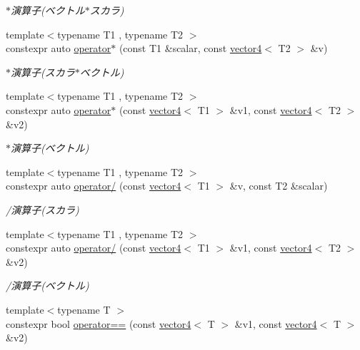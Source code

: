 \begin{DoxyCompactItemize}
\begin{DoxyCompactList}\small\item\em $\ast$演算子(ベクトル$\ast$スカラ) \end{DoxyCompactList}\item 
{\footnotesize template$<$typename T1 , typename T2 $>$ }\\constexpr auto \mbox{\hyperlink{namespacesaki_ad1caaaf5b1af879f2d546a4b2e10974e}{operator$\ast$}} (const T1 \&scalar, const \mbox{\hyperlink{classsaki_1_1vector4}{vector4}}$<$ T2 $>$ \&v)
\begin{DoxyCompactList}\small\item\em $\ast$演算子(スカラ$\ast$ベクトル) \end{DoxyCompactList}\item 
{\footnotesize template$<$typename T1 , typename T2 $>$ }\\constexpr auto \mbox{\hyperlink{namespacesaki_a19656e376d8720e2a67f3d08082770b0}{operator$\ast$}} (const \mbox{\hyperlink{classsaki_1_1vector4}{vector4}}$<$ T1 $>$ \&v1, const \mbox{\hyperlink{classsaki_1_1vector4}{vector4}}$<$ T2 $>$ \&v2)
\begin{DoxyCompactList}\small\item\em $\ast$演算子(ベクトル) \end{DoxyCompactList}\item 
{\footnotesize template$<$typename T1 , typename T2 $>$ }\\constexpr auto \mbox{\hyperlink{namespacesaki_a5525c6da34ded0620ee6d965e687bedc}{operator/}} (const \mbox{\hyperlink{classsaki_1_1vector4}{vector4}}$<$ T1 $>$ \&v, const T2 \&scalar)
\begin{DoxyCompactList}\small\item\em /演算子(スカラ) \end{DoxyCompactList}\item 
{\footnotesize template$<$typename T1 , typename T2 $>$ }\\constexpr auto \mbox{\hyperlink{namespacesaki_ac72c945dc5e1e8fe6065beac4a310a54}{operator/}} (const \mbox{\hyperlink{classsaki_1_1vector4}{vector4}}$<$ T1 $>$ \&v1, const \mbox{\hyperlink{classsaki_1_1vector4}{vector4}}$<$ T2 $>$ \&v2)
\begin{DoxyCompactList}\small\item\em /演算子(ベクトル) \end{DoxyCompactList}\item 
{\footnotesize template$<$typename T $>$ }\\constexpr bool \mbox{\hyperlink{namespacesaki_abe77ceb7257097320a66f9f182d11111}{operator==}} (const \mbox{\hyperlink{classsaki_1_1vector4}{vector4}}$<$ T $>$ \&v1, const \mbox{\hyperlink{classsaki_1_1vector4}{vector4}}$<$ T $>$ \&v2)

\end{DoxyCompactItemize}
